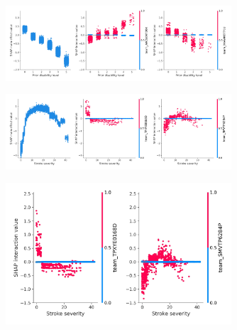     \newpage
    
    \begin{figure}[!h]
    \centering
    \includegraphics[width=0.75\textwidth]{./images/12aa_xgb_10_features_Prior disability level_interaction_example_with_main_effect}
    \caption{}
    \label{fig:results_5}
    \end{figure}
    
    \newpage
    
    \begin{figure}[!h]
    \centering
    \includegraphics[width=0.75\textwidth]{./images/12aa_xgb_10_features_Stroke severity_interaction_example_with_main_effect}
    \caption{}
    \label{fig:results_6}
    \end{figure}
    
    \newpage
    
    \begin{figure}[!h]
    \centering
    \includegraphics[width=0.75\textwidth]{./images/12ab_stroke_severity_interaction_example}
    \caption{}
    \label{fig:results_7}
    \end{figure}
    
    \newpage
    
